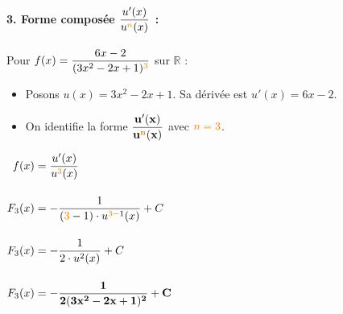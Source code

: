 \documentclass[12pt,a4paper]{article}
\begin{document}
\begin{tcolorbox}[colback=gray!5!white,colframe=myblue,title=\textbf{Correction détaillée}]
\vspace{0.4cm}

\paragraph{3. Forme composée $\dfrac{u'(x)}{u^{\color{orange}n}(x)}$ :}
Pour $f(x) = \dfrac{6x - 2}{(3x^2 - 2x + 1)^{\color{orange}3}}$ sur $\mathbb{R}$ :
\begin{itemize}
    \item Posons $u(x) = 3x^2 - 2x + 1$. Sa dérivée est $u'(x) = 6x - 2$.
    \item On identifie la forme $\mathbf{\dfrac{u'(x)}{u^{\color{orange}n}(x)}}$ avec ${\color{orange}n = 3}$.
\end{itemize}

$
\begin{aligned}
f(x) &= \frac{u'(x)}{u^{\color{orange}3}(x)}\\[4mm]
F_3(x) &= -\frac{1}{({\color{orange}3} - 1) \cdot u^{{\color{orange}3} - 1}(x)} + C\\[4mm]
F_3(x) &= -\frac{1}{2 \cdot u^2(x)} + C\\[4mm]
F_3(x) &= \mathbf{-\frac{1}{2(3x^2 - 2x + 1)^2} + C}
\end{aligned}
$

\end{tcolorbox}
\end{document}
